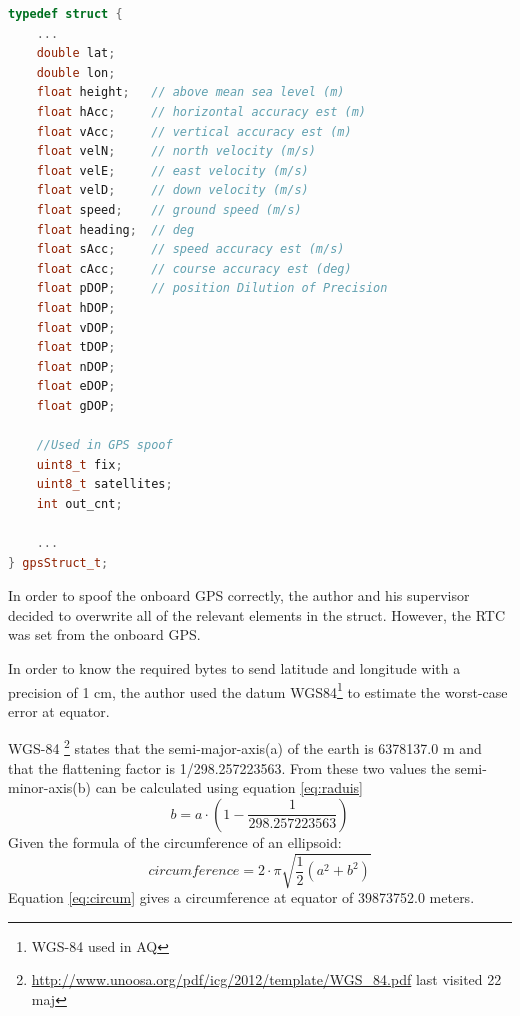 \begin{lstlisting}[language = c++, caption = Quality checks added to discard bad positions, label=code:gpsData_Struct]
typedef struct {
	...
    double lat;
    double lon;
    float height;   // above mean sea level (m)
    float hAcc;     // horizontal accuracy est (m)
    float vAcc;     // vertical accuracy est (m)
    float velN;     // north velocity (m/s)
    float velE;     // east velocity (m/s)
    float velD;     // down velocity (m/s)
    float speed;    // ground speed (m/s)
    float heading;  // deg
    float sAcc;     // speed accuracy est (m/s)
    float cAcc;     // course accuracy est (deg)
    float pDOP;     // position Dilution of Precision
    float hDOP;
    float vDOP;
    float tDOP;
    float nDOP;
    float eDOP;
    float gDOP;

    //Used in GPS spoof
    uint8_t fix;
    uint8_t satellites;
    int out_cnt;

	...
} gpsStruct_t;
\end{lstlisting}


In order to spoof the onboard GPS correctly, the author and his supervisor decided to overwrite all of the relevant elements in the struct. However, the RTC was set from the onboard GPS.

In order to know the required bytes to send latitude and longitude with a precision of 1 cm, the author used the datum WGS84\footnote{WGS-84 used in AQ} to estimate the worst-case error at equator. 

WGS-84 \footnote{\url{http://www.unoosa.org/pdf/icg/2012/template/WGS_84.pdf} last visited 22 maj} states that the semi-major-axis(a) of the earth is 6378137.0 m and that the flattening factor is 1/298.257223563. From these two values the semi-minor-axis(b) can be calculated using equation \ref{eq:raduis}
\begin{equation}
b=a \cdot (1-\frac{1}{298.257223563})
\end{equation} \label{eq:raduis}
Given the formula of the circumference of an ellipsoid:
\begin{equation}
circumference = 2 \cdot \pi \sqrt{ \frac{1}{2}(a^2+b^2)}
\end{equation} \label{eq:circum}
Equation \ref{eq:circum} gives a circumference at equator of 39873752.0 meters.

